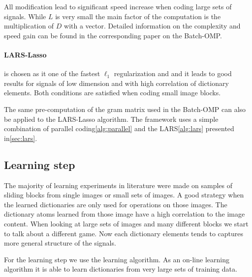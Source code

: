 All modification lead to significant speed increase when coding large sets of
signals. While $L$ is very small the main factor of the computation is
the multiplication of $D$ with a vector. Detailed information on the complexity
and speed gain can be found in the corresponding paper\cite{Rubinstein2008} on
the Batch-OMP. 



\paragraph{LARS-Lasso} is chosen as it one of the fastest $\ell_1$
regularization and and it leads to good results for signals of low dimension and
with high correlation of dictionary elements. Both conditions are satisfied
when coding small image blocks.

The same pre-computation of the gram matrix used in the Batch-OMP can also
be applied to the LARS-Lasso algorithm. The framework uses a simple combination
of parallel coding\ref{alg:parallel} and the LARS\ref{alg:lars} presented
in\ref{sec:lars}.

\subsection{Learning step}
The majority of learning experiments in literature were made on
samples of sliding blocks from single images or small sets of images.
A good strategy when the learned dictionaries are only used for operations on
those images. The dictionary atoms learned from those image have a high
correlation to the image content.  When looking at large sets of images and many
different blocks we start to talk about a different game. Now each dictionary
elements tends to captures more general structure of the signals.

For the learning step we use the \trainDL learning algorithm. As an on-line
learning algorithm it is able to learn dictionaries from very large sets of
training data.


